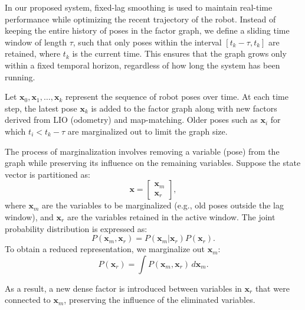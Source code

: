 In our proposed system, fixed-lag smoothing is used to maintain real-time performance while optimizing the recent trajectory of the robot. Instead of keeping the entire history of poses in the factor graph, we define a sliding time window of length \( \tau \), such that only poses within the interval \( [t_k - \tau, t_k] \) are retained, where \( t_k \) is the current time. This ensures that the graph grows only within a fixed temporal horizon, regardless of how long the system has been running.

Let \( \mathbf{x}_0, \mathbf{x}_1, \dots, \mathbf{x}_k \) represent the sequence of robot poses over time. At each time step, the latest pose \( \mathbf{x}_k \) is added to the factor graph along with new factors derived from LIO (odometry) and map-matching. Older poses such as \( \mathbf{x}_i \) for which \( t_i < t_k - \tau \) are marginalized out to limit the graph size.

The process of marginalization involves removing a variable (pose) from the graph while preserving its influence on the remaining variables. Suppose the state vector is partitioned as:
\begin{equation}
	\mathbf{x} = \begin{bmatrix} \mathbf{x}_m \\ \mathbf{x}_r \end{bmatrix},
\end{equation}
where \( \mathbf{x}_m \) are the variables to be marginalized (e.g., old poses outside the lag window), and \( \mathbf{x}_r \) are the variables retained in the active window. The joint probability distribution is expressed as:
\begin{equation}
	P(\mathbf{x}_m, \mathbf{x}_r) = P(\mathbf{x}_m | \mathbf{x}_r) P(\mathbf{x}_r).
\end{equation}
To obtain a reduced representation, we marginalize out \( \mathbf{x}_m \):
\begin{equation}
	P(\mathbf{x}_r) = \int P(\mathbf{x}_m, \mathbf{x}_r) \, d\mathbf{x}_m.
\end{equation}

As a result, a new dense factor is introduced between variables in \( \mathbf{x}_r \) that were connected to \( \mathbf{x}_m \), preserving the influence of the eliminated variables.


